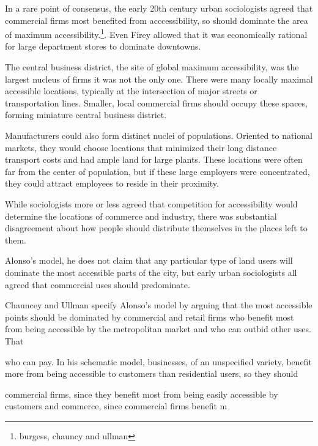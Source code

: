 In a rare point of consensus, the early 20th century urban
sociologists agreed that commercial firms most benefited from
acccessibility, so should dominate the area of maximum
accessibility.\footnote{burgess, chauncy and ullman}. Even Firey
allowed that it was economically rational for large department stores
to dominate downtowns.

The central business district, the site of global maximum
accessibility, was the largest nucleus of firms it was not the only
one. There were many locally maximal accessible locations, typically
at the intersection of major streets or transportation lines. Smaller,
local commercial firms should occupy these spaces, forming miniature
central business district.

Manufacturers could also form distinct nuclei of populations. Oriented
to national markets, they would choose locations that minimized their
long distance transport costs and had ample land for large
plants. These locations were often far from the center of population,
but if these large employers were concentrated, they could attract
employees to reside in their proximity.

While sociologists more or less agreed that competition for
accessibility would determine the locations of commerce and industry,
there was substantial disagreement about how people should distribute
themselves in the places left to them.







Alonso's model, he does not claim that any particular type of land users
will dominate the most accessible parts of the city, but early urban
sociologists all agreed that commercial uses should predominate. 

Chauncey and Ullman specify Alonso's model by arguing that the most
accessible points should be dominated by commercial and retail firms
who benefit most from being accessible by the metropolitan market and
who can outbid other uses. That 


who can pay. In his
schematic model, businesses, of an unspecified variety, benefit more
from being accessible to customers than residential users, so they
should 


commercial firms, since they benefit most from being easily accessible
by customers and 
commerce, since commercial firms benefit m



